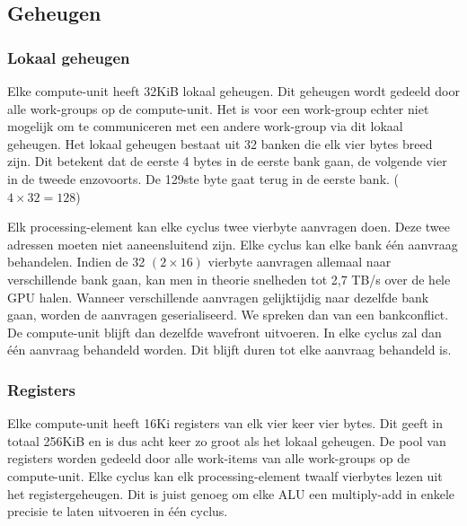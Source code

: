 
\subsection{Geheugen}

\subsubsection{Lokaal geheugen}
Elke compute-unit heeft 32KiB lokaal geheugen. Dit geheugen wordt gedeeld door alle work-groups  op de compute-unit. Het is voor een work-group echter niet mogelijk om te communiceren met een andere work-group via dit lokaal geheugen. Het lokaal geheugen bestaat uit 32 banken die elk vier bytes breed zijn. Dit betekent dat de eerste 4 bytes in de eerste bank gaan, de volgende vier in de tweede enzovoorts. De 129ste byte gaat terug in de eerste bank. ($4 \times 32 = 128$)

Elk processing-element kan elke cyclus twee vierbyte aanvragen doen. Deze twee adressen moeten niet aaneensluitend zijn. Elke cyclus kan elke bank \'e\'en aanvraag behandelen. Indien de 32 $(2 \times 16)$ vierbyte aanvragen allemaal naar verschillende bank gaan, kan men in theorie snelheden tot 2,7 TB/s over de hele GPU halen. Wanneer verschillende aanvragen gelijktijdig naar dezelfde bank gaan, worden de aanvragen geserialiseerd. We spreken dan van een bankconflict. De compute-unit blijft dan dezelfde wavefront uitvoeren. In elke cyclus zal dan \'e\'en aanvraag behandeld worden. Dit blijft duren tot elke aanvraag behandeld is.

\subsubsection{Registers}
Elke compute-unit heeft 16Ki registers van elk vier keer vier bytes. Dit geeft in totaal 256KiB en is dus acht keer zo groot als het lokaal geheugen. De pool van registers worden gedeeld door alle work-items van alle work-groups op de compute-unit.   Elke cyclus kan elk processing-element twaalf vierbytes lezen uit het registergeheugen. Dit is juist genoeg om elke ALU een multiply-add in enkele precisie te laten uitvoeren in \'e\'en cyclus.


